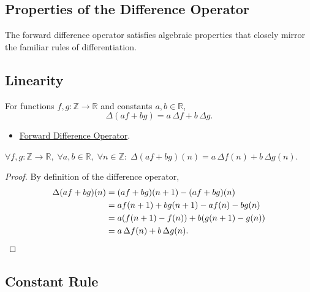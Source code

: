 
\subsection{Properties of the Difference Operator}
\label{subsec:difference-operator-properties}

The forward difference operator satisfies algebraic properties that
closely mirror the familiar rules of differentiation.

\subsection*{Linearity}

\begin{proposition}
\label{prop:delta-linearity}
For functions \(f,g : \mathbb{Z} \to \mathbb{R}\) and constants \(a,b \in \mathbb{R}\),
\[
\Delta (a f + b g)
=
a\,\Delta f + b\,\Delta g.
\]
\end{proposition}

\begin{dependencies}
\begin{itemize}
  \item \hyperref[def:forward-difference]{Forward Difference Operator}.
\end{itemize}
\end{dependencies}

\begin{remark*}
\(\forall f,g : \mathbb{Z}\to\mathbb{R},\;
\forall a,b \in \mathbb{R},\;
\forall n \in \mathbb{Z}:\;
\Delta(af+bg)(n) = a\,\Delta f(n) + b\,\Delta g(n)\).
\end{remark*}

\begin{proof}
By definition of the difference operator,
\[
\begin{aligned}
\Delta (a f + b g)(n)
&= (a f + b g)(n+1) - (a f + b g)(n) \\
&= a f(n+1) + b g(n+1) - a f(n) - b g(n) \\
&= a(f(n+1)-f(n)) + b(g(n+1)-g(n)) \\
&= a\,\Delta f(n) + b\,\Delta g(n). \qedhere
\end{aligned}
\]
\end{proof}

\subsection*{Constant Rule}

